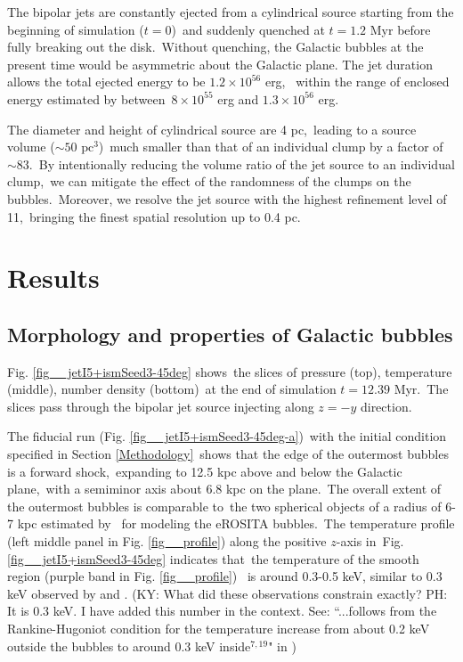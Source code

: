\documentclass[fleqn,usenatbib,useAMS]{mnras}
\begin{document}
  The bipolar jets are constantly ejected from a cylindrical source starting from the beginning of simulation ($t=0$)\
  and suddenly quenched at $t=1.2$ Myr before fully breaking out the disk.\
  Without quenching, the Galactic bubbles at the present time would be asymmetric about the Galactic plane.
  The jet duration allows the total ejected energy to be $1.2\times10^{56}$ erg, \
  within the range of enclosed energy estimated by \citet{Predehl2020} between\
  $8\times10^{55}$ erg and $1.3\times10^{56}$ erg.



  The diameter and height of cylindrical source are 4 pc,\
  leading to a source volume ($\sim 50 \text{ pc}^{3}$)\
  much smaller than that of an individual clump by a factor of $\sim 83$.\
  By intentionally reducing the volume ratio of the jet source to an individual clump,\
  we can mitigate the effect of the randomness of the clumps on the bubbles.\
  Moreover, we resolve the jet source with the highest refinement level of 11,\
  bringing the finest spatial resolution up to 0.4 pc.\

\section{Results}
\label{Results}

\subsection{Morphology and properties of Galactic bubbles}

 Fig. \ref{fig__jetI5+ismSeed3-45deg} shows\
 the slices of pressure (top), temperature (middle), number density (bottom)\
 at the end of simulation $t=12.39$ Myr.\
 The slices pass through the bipolar jet source injecting along $z=-y$ direction.

 The fiducial run (Fig. \ref{fig__jetI5+ismSeed3-45deg-a})\
 with the initial condition specified in Section \ref{Methodology}\
 shows that the edge of the outermost bubbles is a forward shock,\
 expanding to 12.5 kpc above and below the Galactic plane,\
 with a semiminor axis about 6.8 kpc on the plane.\
 The overall extent of the outermost bubbles is comparable to\
 the two spherical objects of a radius of 6-7 kpc estimated by \citet{Predehl2020}\
 for modeling the eROSITA bubbles.\
 The temperature profile (left middle panel in Fig. \ref{fig__profile}) along the positive $z$-axis in\
 Fig. \ref{fig__jetI5+ismSeed3-45deg} indicates that\
 the temperature of the smooth region (purple band in Fig. \ref{fig__profile})\ %
 is around 0.3-0.5 keV, similar to 0.3 keV observed by \citet{Miller2016} and \citet{Kataoka2018}. {\color{red} (KY: What did these observations constrain exactly?
PH: It is 0.3 keV. I have added this number in the context. See: ``...follows from the Rankine-Hugoniot condition for the temperature increase from about 0.2 keV outside the bubbles to around 0.3 keV inside$^{7,19}$" in \citealt{Predehl2020})}
\end{document}
